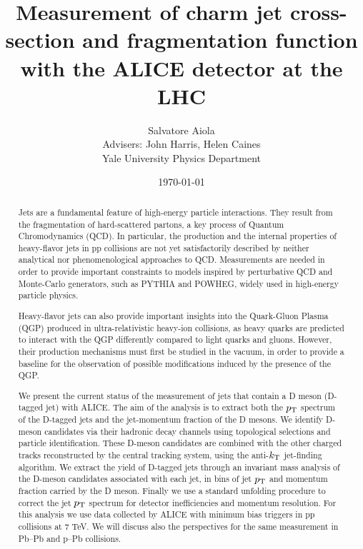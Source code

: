 \documentclass[12pt, a4paper, twoside, titlepage]{article}
\title{Measurement of charm jet cross-section and fragmentation function
with the ALICE detector at the LHC}
\author{Salvatore Aiola  \\
	Advisers: John Harris, Helen Caines \\
	Yale University Physics Department
	}
\date{\today}
\begin{document}
\maketitle

\begin{abstract}
Jets are a fundamental feature of high-energy particle interactions. 
They result from the fragmentation of hard-scattered partons, 
a key process of Quantum Chromodynamics (QCD). 
In particular, the production and the internal properties of heavy-flavor jets 
in pp collisions are not yet satisfactorily described by neither analytical nor 
phenomenological approaches to QCD. Measurements are needed
in order to provide important constraints to models inspired by perturbative QCD 
and Monte-Carlo generators, such as PYTHIA and POWHEG, widely used in high-energy particle physics.

Heavy-flavor jets can also provide important insights into the Quark-Gluon Plasma (QGP)
produced in ultra-relativistic heavy-ion collisions, as heavy quarks are predicted
to interact with the QGP differently compared to light quarks and gluons. 
However, their production mechanisms must first be studied in the vacuum, 
in order to provide a baseline for the observation of possible modifications induced by the presence of the QGP. 

We present the current status of the measurement of jets that contain a D meson (D-tagged jet) with \mbox{ALICE}.
The aim of the analysis is to extract both the $p_{\rm T}$ spectrum of the D-tagged jets and the jet-momentum fraction of the D mesons. 
We identify D-meson candidates via their hadronic decay channels using topological selections and particle identification.
These D-meson candidates are combined with the other charged tracks reconstructed by the central tracking system, 
using the anti-$k_{\rm T}$ jet-finding algorithm.
We extract the yield of D-tagged jets through an invariant mass analysis of the D-meson candidates associated with each jet, 
in bins of jet $p_{\rm T}$ and momentum fraction carried by the D meson. Finally we use a standard unfolding procedure 
to correct the jet $p_{\rm T}$ spectrum for detector inefficiencies and momentum resolution. For this analysis we use data collected
by ALICE with minimum bias triggers in pp collisions at 7 TeV. We will discuss also
the perspectives for the same measurement in Pb--Pb and p--Pb collisions.
\end{abstract}
\end{document}
